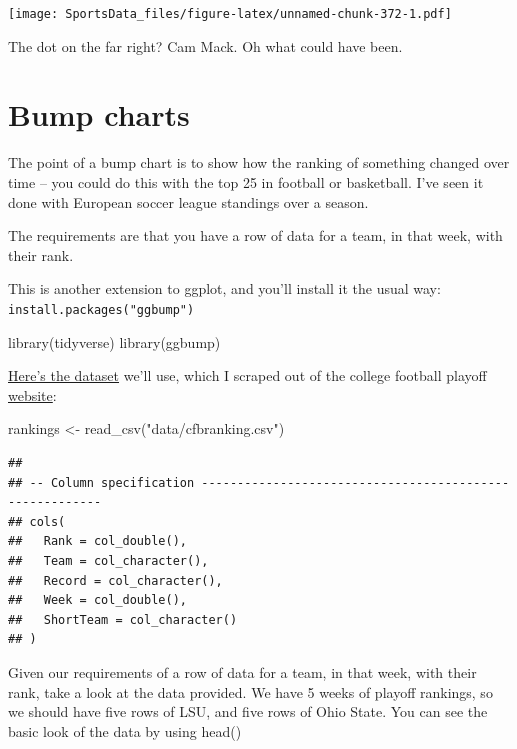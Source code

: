\documentclass[
]{book}
\newenvironment{Shaded}{\begin{snugshade}}{\end{snugshade}}
\newcommand{\FunctionTok}[1]{\textcolor[rgb]{0.00,0.00,0.00}{#1}}
\newcommand{\NormalTok}[1]{#1}
\newcommand{\OtherTok}[1]{\textcolor[rgb]{0.56,0.35,0.01}{#1}}
\newcommand{\StringTok}[1]{\textcolor[rgb]{0.31,0.60,0.02}{#1}}
\begin{document}
\texttt{[image: SportsData\_files/figure-latex/unnamed-chunk-372-1.pdf]}

The dot on the far right? Cam Mack. Oh what could have been.

\hypertarget{bump-charts}{%
\chapter{Bump charts}\label{bump-charts}}

The point of a bump chart is to show how the ranking of something changed over time -- you could do this with the top 25 in football or basketball. I've seen it done with European soccer league standings over a season.

The requirements are that you have a row of data for a team, in that week, with their rank.

This is another extension to ggplot, and you'll install it the usual way: \texttt{install.packages("ggbump")}

\begin{Shaded}
\begin{Highlighting}[]
\FunctionTok{library}\NormalTok{(tidyverse)}
\FunctionTok{library}\NormalTok{(ggbump)}
\end{Highlighting}
\end{Shaded}

\href{https://unl.box.com/s/zgb8hv2fdzz36lcs5bcje59ri84dqjai}{Here's the dataset} we'll use, which I scraped out of the college football playoff \href{https://collegefootballplayoff.com/rankings.aspx}{website}:

\begin{Shaded}
\begin{Highlighting}[]
\NormalTok{rankings }\OtherTok{\textless{}{-}} \FunctionTok{read\_csv}\NormalTok{(}\StringTok{"data/cfbranking.csv"}\NormalTok{)}
\end{Highlighting}
\end{Shaded}

\begin{verbatim}
## 
## -- Column specification --------------------------------------------------------
## cols(
##   Rank = col_double(),
##   Team = col_character(),
##   Record = col_character(),
##   Week = col_double(),
##   ShortTeam = col_character()
## )
\end{verbatim}

Given our requirements of a row of data for a team, in that week, with their rank, take a look at the data provided. We have 5 weeks of playoff rankings, so we should have five rows of LSU, and five rows of Ohio State. You can see the basic look of the data by using head()
\end{document}
